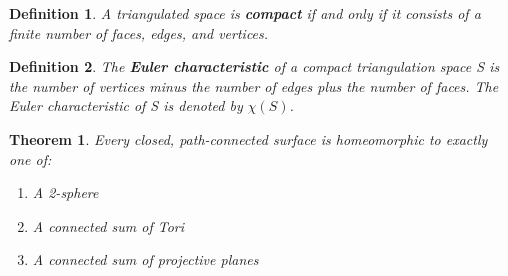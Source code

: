 \documentclass[executivepaper]{article}
\newtheorem{definition}{Definition}
\newtheorem{theorem}{Theorem}
\begin{document}
\vspace{2mm}

\begin{tcolorbox}

\begin{definition}

\textit{A triangulated space is \textbf{compact} if and only if it consists of a finite number of faces, edges, and vertices.}

\end{definition}

\end{tcolorbox}

\pagebreak

\vspace*{-30mm}

\begin{tcolorbox}

\begin{definition}

\textit{The \textbf{Euler characteristic} of a compact triangulation space S is the number of vertices minus the number of edges plus the number of faces. The Euler characteristic of S is denoted by $\chi(S)$.}

\end{definition}

\end{tcolorbox}

\begin{tcolorbox}

\begin{theorem}

\textit{Every closed, path-connected surface is homeomorphic to exactly one of:}

\begin{center}

\begin{enumerate}

\item A 2-sphere

\item A connected sum of Tori

\item A connected sum of projective planes

\end{enumerate}

\end{center}

\end{theorem}

\end{tcolorbox}
\end{document}
